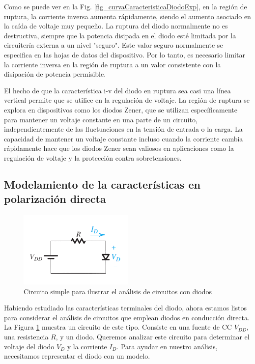 Como se puede ver en la Fig. \ref{fig_curvaCaracteristicaDiodoExp}, en la región de ruptura, la corriente inversa aumenta rápidamente, siendo el aumento asociado en la caída de voltaje muy pequeño. La ruptura del diodo normalmente no es destructiva, siempre que la potencia disipada en el diodo esté limitada por la circuitería externa a un nivel "seguro". Este valor seguro normalmente se especifica en las hojas de datos del dispositivo. Por lo tanto, es necesario limitar la corriente inversa en la región de ruptura a un valor consistente con la disipación de potencia permisible.

El hecho de que la característica i-v del diodo en ruptura sea casi una línea vertical permite que se utilice en la regulación de voltaje. La región de ruptura se explora en dispositivos como los diodos Zener, que se utilizan específicamente para mantener un voltaje constante en una parte de un circuito, independientemente de las fluctuaciones en la tensión de entrada o la carga. La capacidad de mantener un voltaje constante incluso cuando la corriente cambia rápidamente hace que los diodos Zener sean valiosos en aplicaciones como la regulación de voltaje y la protección contra sobretensiones.

\subsection{Modelamiento de la características en polarización directa}

\begin{figure}[H]
    \centering
    \includegraphics{Electronica/diodo_f6.png}
    \caption{Circuito simple para ilustrar el análisis de circuitos con diodos}
    \label{fig_circuitoSimpleDiodoRes}
\end{figure}

Habiendo estudiado las características terminales del diodo, ahora estamos listos para considerar el análisis de circuitos que emplean diodos en conducción directa. La Figura \ref{fig_circuitoSimpleDiodoRes} muestra un circuito de este tipo. Consiste en una fuente de CC \( V_{DD} \), una resistencia \( R \), y un diodo. Queremos analizar este circuito para determinar el voltaje del diodo \( V_D \) y la corriente \( I_D \). Para ayudar en nuestro análisis, necesitamos representar el diodo con un modelo.

